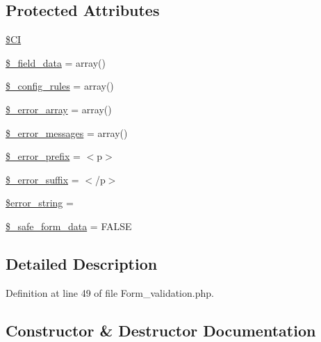 \subsection*{Protected Attributes}
\begin{DoxyCompactItemize}
\item 
\mbox{\hyperlink{class_c_i___form__validation_ae0314d046ddf7fcfaec03222977427d3}{\$\+CI}}
\item 
\mbox{\hyperlink{class_c_i___form__validation_a8263493b8d14294371f1f157ea632df5}{\$\+\_\+field\+\_\+data}} = array()
\item 
\mbox{\hyperlink{class_c_i___form__validation_aa1b63acebe8880c36ea51e11a57eb0d3}{\$\+\_\+config\+\_\+rules}} = array()
\item 
\mbox{\hyperlink{class_c_i___form__validation_a50e8f829178352ca2ea7777cb491b7f8}{\$\+\_\+error\+\_\+array}} = array()
\item 
\mbox{\hyperlink{class_c_i___form__validation_a04bf2e3e86d96dde4d4353c053b81473}{\$\+\_\+error\+\_\+messages}} = array()
\item 
\mbox{\hyperlink{class_c_i___form__validation_ad4e512c18b95689885fcee10b5489901}{\$\+\_\+error\+\_\+prefix}} = \textquotesingle{}$<$p$>$\textquotesingle{}
\item 
\mbox{\hyperlink{class_c_i___form__validation_ab5c737026065a0b4c7bdd5414eec6a6d}{\$\+\_\+error\+\_\+suffix}} = \textquotesingle{}$<$/p$>$\textquotesingle{}
\item 
\mbox{\hyperlink{class_c_i___form__validation_a22323b47b58139586ed855d04138d212}{\$error\+\_\+string}} = \textquotesingle{}\textquotesingle{}
\item 
\mbox{\hyperlink{class_c_i___form__validation_ad767d36cd2cc57999044f0a94a0e470f}{\$\+\_\+safe\+\_\+form\+\_\+data}} = F\+A\+L\+SE
\end{DoxyCompactItemize}


\subsection{Detailed Description}


Definition at line 49 of file Form\+\_\+validation.\+php.



\subsection{Constructor \& Destructor Documentation}
\mbox{\label{class_c_i___form__validation_ac7224a1f92da249b312d1400c459ba83}} 
